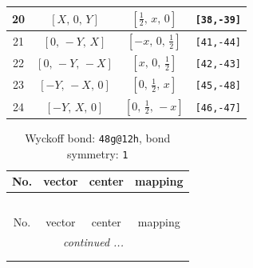 \documentclass[fleqn,8pt]{jsarticle}
\begin{document}
\begin{longtable}{cccc}
20 & $\left[ X,\, 0,\, Y \right]$ & $\left[ \frac{1}{2},\, x,\, 0 \right]$ & {\tt [38,-39]} \\ \hline
21 & $\left[ 0,\, - Y,\, X \right]$ & $\left[ - x,\, 0,\, \frac{1}{2} \right]$ & {\tt [41,-44]} \\ \hline
22 & $\left[ 0,\, - Y,\, - X \right]$ & $\left[ x,\, 0,\, \frac{1}{2} \right]$ & {\tt [42,-43]} \\ \hline
23 & $\left[ - Y,\, - X,\, 0 \right]$ & $\left[ 0,\, \frac{1}{2},\, x \right]$ & {\tt [45,-48]} \\ \hline
24 & $\left[ - Y,\, X,\, 0 \right]$ & $\left[ 0,\, \frac{1}{2},\, - x \right]$ & {\tt [46,-47]} \\
\end{longtable}
\renewcommand{\arraystretch}{1.2}
\begin{longtable}{cccc}
\caption{Wyckoff bond: {\tt 48g@12h}, bond symmetry: {\tt 1}}
 \\
 \hline \hline
No. & vector & center & mapping \\ \hline \endfirsthead

\multicolumn{3}{l}{\tablename\ \thetable{}} \\
 \hline \hline
No. & vector & center & mapping \\ \hline \endhead

 \hline \hline
\multicolumn{3}{r}{\footnotesize\it continued ...} \\ \endfoot

 \hline \hline
\multicolumn{3}{r}{} \\ \endlastfoot


\end{longtable}
\end{document}
